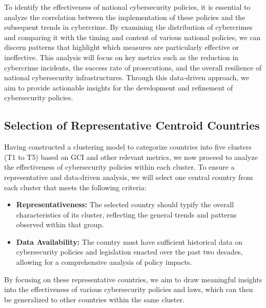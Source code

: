 
To identify the effectiveness of national cybersecurity policies,
it is essential to analyze the correlation between the implementation of these policies and the subsequent trends in cybercrime.
By examining the distribution of cybercrimes and comparing it with the timing and content of various national policies,
we can discern patterns that highlight which measures are particularly effective or ineffective.
This analysis will focus on key metrics such as the reduction in
cybercrime incidents, the success rate of prosecutions, and the overall resilience of national cybersecurity infrastructures.
Through this data-driven approach,
we aim to provide actionable insights for the development and refinement of cybersecurity policies.
\subsection{Selection of Representative Centroid Countries}\label{subsec:selection-of-representative centroid-countries} %
    Having constructed a clustering model to categorize countries into five clusters (T1 to T5) based on GCI and other relevant metrics,
    we now proceed to analyze the effectiveness of cybersecurity policies within each cluster.
    To ensure a representative and data-driven analysis,
    we will select one central country from each cluster that meets the following criteria:
    \begin{itemize}
        \item \textbf{Representativeness:}
        The selected country should typify the overall characteristics of its cluster,
        reflecting the general trends and patterns observed within that group.
        \item \textbf{Data Availability:}
        The country must have sufficient historical data on cybersecurity policies and legislation enacted over the past two decades,
        allowing for a comprehensive analysis of policy impacts.
    \end{itemize}
    By focusing on these representative countries,
    we aim to draw meaningful insights into the effectiveness of various cybersecurity policies and laws,
    which can then be generalized to other countries within the same cluster.
    
